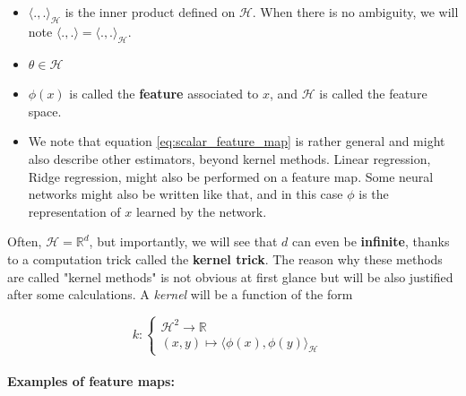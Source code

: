 \documentclass[
10pt, %
a4paper, %
oneside, %
headinclude,footinclude, %
BCOR5mm, %
]{scrartcl}
\begin{document}
\begin{itemize}
    \item $ \langle ., . \rangle_{ \mathcal{H} }$ is the inner product defined on $ \mathcal{H} $. When there is no ambiguity, we will note $ \langle ., . \rangle= \langle ., . \rangle_{ \mathcal{H} }$.
    \item $ \theta\in  \mathcal{H} $
    \item $ \phi(x)$ is called the \textbf{{feature}} associated to $x$, and $ \mathcal{H} $ is called the feature space.
    \item We note that equation \ref{eq:scalar_feature_map} is rather general and might also describe other estimators, beyond kernel methods. Linear regression, Ridge regression, might also be performed on a feature map. Some neural networks might also be written like that, and in this case $\phi$ is the representation of $x$ learned by the network.
\end{itemize}

Often, $ \mathcal{H} = \mathbb{R}^d $, but importantly, we will see that $d$ can even be \textbf{{infinite}}, thanks to a computation trick called the \textbf{{kernel trick}}. The reason why these methods are called "kernel methods" is not obvious at first glance but will be also justified after some calculations.  A \textit{{kernel}} will be a function of the form


$$
k  : \left\{
    \begin{array}{ll}
	\mathcal{H}^2  \rightarrow \mathbb{R}  \\
	(x,y) \mapsto \langle \phi(x), \phi(y) \rangle_{ \mathcal{H} } & 
    \end{array}
\right.
$$
\\


\textbf{{Examples of feature maps:}} 
\end{document}
